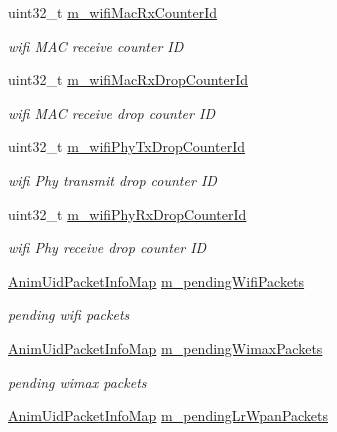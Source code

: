 \begin{DoxyCompactItemize}
uint32\+\_\+t \hyperlink{classns3_1_1AnimationInterface_a0b93a577be343a7e420eb3facae9084e}{m\+\_\+wifi\+Mac\+Rx\+Counter\+Id}
\begin{DoxyCompactList}\small\item\em wifi M\+AC receive counter ID \end{DoxyCompactList}\item 
uint32\+\_\+t \hyperlink{classns3_1_1AnimationInterface_ad8ff0ee590e7c76a22b03cb98299284f}{m\+\_\+wifi\+Mac\+Rx\+Drop\+Counter\+Id}
\begin{DoxyCompactList}\small\item\em wifi M\+AC receive drop counter ID \end{DoxyCompactList}\item 
uint32\+\_\+t \hyperlink{classns3_1_1AnimationInterface_ae2aa7243d535366a66b89cd1742edbed}{m\+\_\+wifi\+Phy\+Tx\+Drop\+Counter\+Id}
\begin{DoxyCompactList}\small\item\em wifi Phy transmit drop counter ID \end{DoxyCompactList}\item 
uint32\+\_\+t \hyperlink{classns3_1_1AnimationInterface_add898bea3193b3f8f3d29d4f9ea9f845}{m\+\_\+wifi\+Phy\+Rx\+Drop\+Counter\+Id}
\begin{DoxyCompactList}\small\item\em wifi Phy receive drop counter ID \end{DoxyCompactList}\item 
\hyperlink{classns3_1_1AnimationInterface_afea577896009c4134df836bc20f1eabe}{Anim\+Uid\+Packet\+Info\+Map} \hyperlink{classns3_1_1AnimationInterface_a9ef0e9ce4273ba81324813f79a069003}{m\+\_\+pending\+Wifi\+Packets}
\begin{DoxyCompactList}\small\item\em pending wifi packets \end{DoxyCompactList}\item 
\hyperlink{classns3_1_1AnimationInterface_afea577896009c4134df836bc20f1eabe}{Anim\+Uid\+Packet\+Info\+Map} \hyperlink{classns3_1_1AnimationInterface_a4ab6c7854d9fb170f89b8102b6639ea9}{m\+\_\+pending\+Wimax\+Packets}
\begin{DoxyCompactList}\small\item\em pending wimax packets \end{DoxyCompactList}\item 
\hyperlink{classns3_1_1AnimationInterface_afea577896009c4134df836bc20f1eabe}{Anim\+Uid\+Packet\+Info\+Map} \hyperlink{classns3_1_1AnimationInterface_aa5fe4fe78cfa8cd3da785292a4a18b71}{m\+\_\+pending\+Lr\+Wpan\+Packets}

\end{DoxyCompactItemize}
